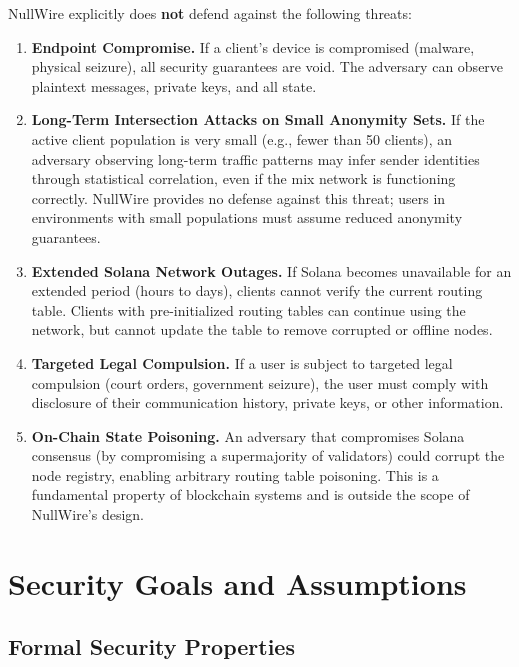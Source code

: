 \documentclass[11pt]{article}
\theoremstyle{definition}
\theoremstyle{remark}
\begin{document}
NullWire explicitly does \textbf{not} defend against the following threats:

\begin{enumerate}
    \item \textbf{Endpoint Compromise.} If a client's device is compromised (malware, physical seizure), all security guarantees are void. The adversary can observe plaintext messages, private keys, and all state.

    \item \textbf{Long-Term Intersection Attacks on Small Anonymity Sets.} If the active client population is very small (e.g., fewer than 50 clients), an adversary observing long-term traffic patterns may infer sender identities through statistical correlation, even if the mix network is functioning correctly. NullWire provides no defense against this threat; users in environments with small populations must assume reduced anonymity guarantees.

    \item \textbf{Extended Solana Network Outages.} If Solana becomes unavailable for an extended period (hours to days), clients cannot verify the current routing table. Clients with pre-initialized routing tables can continue using the network, but cannot update the table to remove corrupted or offline nodes.

    \item \textbf{Targeted Legal Compulsion.} If a user is subject to targeted legal compulsion (court orders, government seizure), the user must comply with disclosure of their communication history, private keys, or other information.

    \item \textbf{On-Chain State Poisoning.} An adversary that compromises Solana consensus (by compromising a supermajority of validators) could corrupt the node registry, enabling arbitrary routing table poisoning. This is a fundamental property of blockchain systems and is outside the scope of NullWire's design.
\end{enumerate}

\section{Security Goals and Assumptions}
\label{sec:goals}

\subsection{Formal Security Properties}
\end{document}
